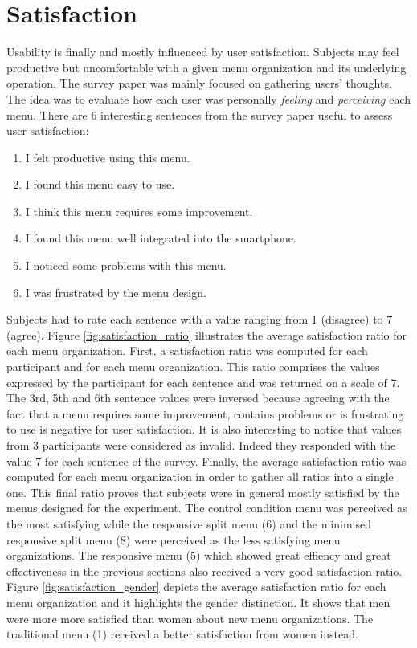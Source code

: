 \begin{figure}[!ht]
    
    \label{fig:selectime_agegender}
\end{figure}

\section{Satisfaction}
Usability is finally and mostly influenced by user satisfaction. Subjects may 
feel productive but uncomfortable with a given menu organization and its 
underlying operation. The survey paper was mainly focused on gathering users' 
thoughts. The idea was to evaluate how each user was personally 
\textit{feeling} 
and \textit{perceiving} each menu. There are 6 interesting sentences from 
the survey paper useful to assess user satisfaction:
\begin{enumerate}
  \item I felt productive using this menu.
  \item I found this menu easy to use.
  \item I think this menu requires some improvement.
  \item I found this menu well integrated into the smartphone.
  \item I noticed some problems with this menu.
  \item I was frustrated by the menu design.
\end{enumerate}
Subjects had to rate each sentence with a value ranging from 1 (disagree) 
to 7 (agree). Figure \ref{fig:satisfaction_ratio} illustrates the average 
satisfaction ratio for each menu organization. First, a satisfaction ratio was 
computed for each participant and for each menu organization. This ratio 
comprises the values expressed by the participant for each sentence and was 
returned on a scale of 7. The 3rd, 5th and 6th sentence values were inversed 
because 
agreeing with the fact that a menu requires some improvement, contains 
problems or is frustrating to use is negative for user satisfaction. It is also 
interesting to notice 
that values from 3 participants were considered as invalid. Indeed they 
responded with the value 7 for each sentence of the survey. Finally, the 
average 
satisfaction ratio was computed for each menu organization in order to gather 
all ratios into a single one. This final ratio proves that subjects were in 
general mostly satisfied by the menus designed for the experiment. The control 
condition menu was perceived as the most satisfying while the responsive split 
menu (6) and the minimised responsive split menu (8) were perceived as the less 
satisfying menu organizations. The responsive menu (5) which showed great 
effiency and great effectiveness in the previous sections also received a very 
good satisfaction ratio. Figure \ref{fig:satisfaction_gender} depicts the 
average satisfaction ratio for each menu organization and it highlights the 
gender distinction. It shows that men were more more satisfied than women about 
new menu organizations. The traditional menu (1) received a better satisfaction 
from women instead.

